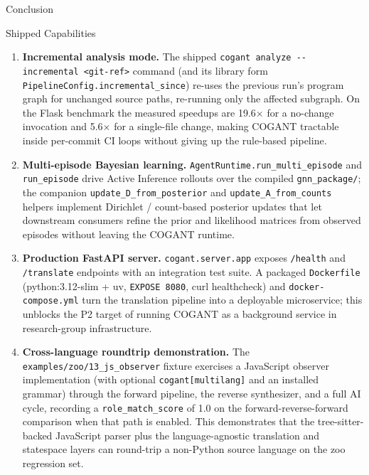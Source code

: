 \documentclass[
  ignorenonframetext,
]{beamer}
\begin{document}
\begin{frame}[fragile]{Conclusion}
\begin{block}{Shipped Capabilities}
\begin{enumerate}
  The canonical
  \texttt{cogant/docs/evaluation/ROUNDTRIP\_IMPROVEMENT.md} documents
  the POLICY/CONTEXT fix trajectory; see §9, S01, S02 for tables.
\item
  \textbf{Incremental analysis mode.} The shipped
  \texttt{cogant\ analyze\ -\/-incremental\ \textless{}git-ref\textgreater{}}
  command (and its library form
  \texttt{PipelineConfig.incremental\_since}) re-uses the previous run's
  program graph for unchanged source paths, re-running only the affected
  subgraph. On the Flask benchmark the measured speedups are
  19.6\(\times\) for a no-change invocation and 5.6\(\times\) for a
  single-file change, making COGANT tractable inside per-commit CI loops
  without giving up the rule-based pipeline.
\item
  \textbf{Multi-episode Bayesian learning.}
  \texttt{AgentRuntime.run\_multi\_episode} and \texttt{run\_episode}
  drive Active Inference rollouts over the compiled
  \texttt{gnn\_package/}; the companion
  \texttt{update\_D\_from\_posterior} and
  \texttt{update\_A\_from\_counts} helpers implement Dirichlet /
  count-based posterior updates that let downstream consumers refine the
  prior and likelihood matrices from observed episodes without leaving
  the COGANT runtime.
\item
  \textbf{Production FastAPI server.} \texttt{cogant.server.app} exposes
  \texttt{/health} and \texttt{/translate} endpoints with an integration
  test suite. A packaged \texttt{Dockerfile} (python:3.12-slim + uv,
  \texttt{EXPOSE\ 8080}, curl healthcheck) and
  \texttt{docker-compose.yml} turn the translation pipeline into a
  deployable microservice; this unblocks the P2 target of running COGANT
  as a background service in research-group infrastructure.
\item
  \textbf{Cross-language roundtrip demonstration.} The
  \texttt{examples/zoo/13\_js\_observer} fixture exercises a JavaScript
  observer implementation (with optional \texttt{cogant{[}multilang{]}}
  and an installed grammar) through the forward pipeline, the reverse
  synthesizer, and a full AI cycle, recording a
  \texttt{role\_match\_score} of 1.0 on the forward-reverse-forward
  comparison when that path is enabled. This demonstrates that the
  tree-sitter-backed JavaScript parser plus the language-agnostic
  translation and statespace layers can round-trip a non-Python source
  language on the zoo regression set.
\end{enumerate}


\end{block}
\end{frame}
\end{document}
